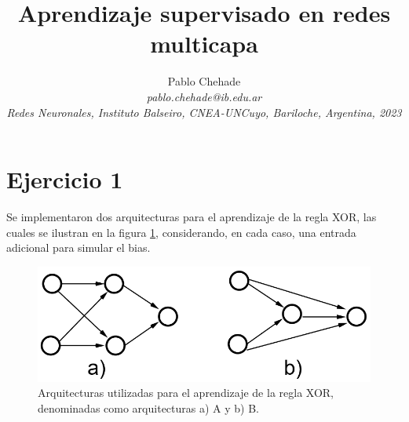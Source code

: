 \documentclass[aps,prb,twocolumn,superscriptaddress,floatfix,longbibliography]{revtex4-2}
\newcounter{para}
\begin{document}
\newcommand{\mytitle}{Aprendizaje supervisado en redes multicapa}

\title{\mytitle}

\author{Pablo Chehade \\
    \small \textit{pablo.chehade@ib.edu.ar} \\
    \small \textit{Redes Neuronales, Instituto Balseiro, CNEA-UNCuyo, Bariloche, Argentina, 2023} \\}
    
\maketitle

\section*{Ejercicio 1}

Se implementaron dos arquitecturas para el aprendizaje de la regla XOR, las cuales se ilustran en la figura \ref{fig:ej1_arquitectura}, considerando, en cada caso, una entrada adicional para simular el bias.

\begin{figure}[h]
    \includegraphics[clip=true,width=\columnwidth]{ej1_arquitectura.png}
    \caption{Arquitecturas utilizadas para el aprendizaje de la regla XOR, denominadas como arquitecturas a) A y b) B.}
     \label{fig:ej1_arquitectura}
\end{figure}
\end{document}
